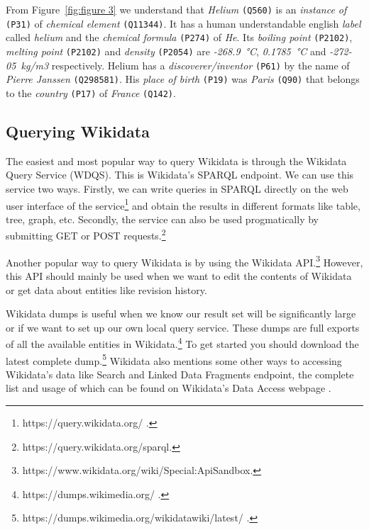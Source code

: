 From Figure~\ref{fig:figure 3} we understand that \textit{Helium} \texttt{(\gls{Q560})} is an \textit{instance of} \texttt{(P31)} of \textit{chemical element} \texttt{(Q11344)}. It has a human understandable english \textit{label} called \textit{helium} and the \textit{chemical formula} \texttt{(P274)} of \textit{He}. Its \textit{boiling point} \texttt{(P2102)}, \textit{melting point} \texttt{(P2102)} and \textit{density} \texttt{(P2054)} are \textit{-268.9~°C}, \textit{0.1785~°C} and \textit{-272-05~kg/m3} respectively. Helium has a \textit{discoverer/inventor} \texttt{(P61)} by the name of \textit{Pierre Janssen} \texttt{(Q298581)}. His \textit{place of birth} \texttt{(P19)} was \textit{Paris} \texttt{(Q90)} that belongs to the \textit{country} \texttt{(P17)} of \textit{France} \texttt{(Q142)}.

\subsection{Querying Wikidata}

The easiest and most popular way to query Wikidata is through the Wikidata Query Service (WDQS). This is Wikidata's SPARQL endpoint. We can use this service two ways. Firstly, we can write queries in SPARQL directly on the web user interface of the service\footnote{https://query.wikidata.org/ .} and obtain the results in different formats like table, tree, graph, etc. Secondly, the service can also be used progmatically by submitting GET or POST requests.\footnote{https://query.wikidata.org/sparql.}

Another popular way to query Wikidata is by using the Wikidata API.\footnote{https://www.wikidata.org/wiki/Special:ApiSandbox.} However, this API should mainly be used when we want to edit the contents of Wikidata or get data about entities like revision history.

Wikidata dumps is useful when we know our result set will be significantly large or if we want to set up our own local query service. These dumps are full exports of all the available entities in Wikidata.\footnote{https://dumps.wikimedia.org/ .} To get started you should download the latest complete dump.\footnote{https://dumps.wikimedia.org/wikidatawiki/latest/ .} Wikidata also mentions some other ways to accessing Wikidata's data like Search and Linked Data Fragments endpoint, the complete list and usage of which can be found on Wikidata's Data Access webpage \cite{ Wikidata2022}.




